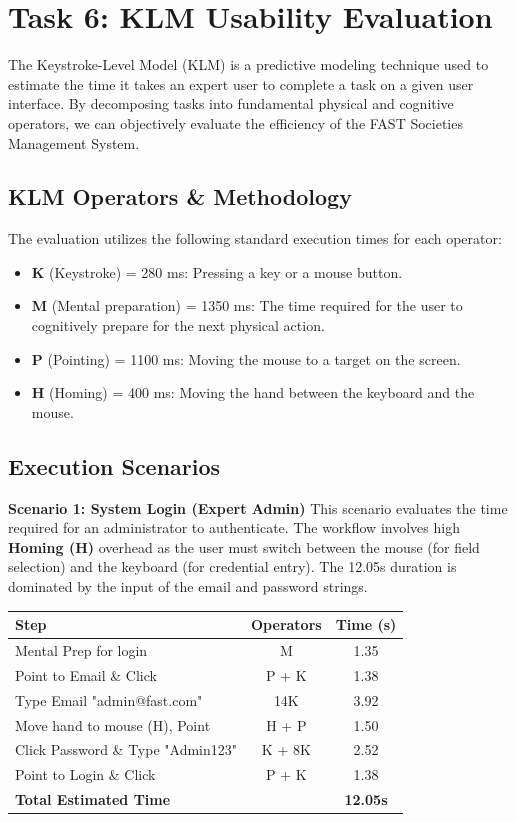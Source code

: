 \documentclass[12pt,a4paper]{article}
\begin{document}
\newpage
\section{Task 6: KLM Usability Evaluation}
The Keystroke-Level Model (KLM) is a predictive modeling technique used to estimate the time it takes an expert user to complete a task on a given user interface. By decomposing tasks into fundamental physical and cognitive operators, we can objectively evaluate the efficiency of the FAST Societies Management System.

\subsection{KLM Operators \& Methodology}
The evaluation utilizes the following standard execution times for each operator:
\begin{itemize}
    \item \textbf{K} (Keystroke) = 280 ms: Pressing a key or a mouse button.
    \item \textbf{M} (Mental preparation) = 1350 ms: The time required for the user to cognitively prepare for the next physical action.
    \item \textbf{P} (Pointing) = 1100 ms: Moving the mouse to a target on the screen.
    \item \textbf{H} (Homing) = 400 ms: Moving the hand between the keyboard and the mouse.
\end{itemize}

\subsection{Execution Scenarios}

\textbf{Scenario 1: System Login (Expert Admin)}
This scenario evaluates the time required for an administrator to authenticate. The workflow involves high \textbf{Homing (H)} overhead as the user must switch between the mouse (for field selection) and the keyboard (for credential entry). The 12.05s duration is dominated by the input of the email and password strings.
\begin{table}[H]
\centering
\begin{tabular}{lcc}
\toprule
\textbf{Step} & \textbf{Operators} & \textbf{Time (s)} \\
\midrule
Mental Prep for login & M & 1.35 \\
Point to Email \& Click & P + K & 1.38 \\
Type Email "admin@fast.com" & 14K & 3.92 \\
Move hand to mouse (H), Point & H + P & 1.50 \\
Click Password \& Type "Admin123" & K + 8K & 2.52 \\
Point to Login \& Click & P + K & 1.38 \\
\midrule
\textbf{Total Estimated Time} & & \textbf{12.05s} \\
\bottomrule
\end{tabular}
\end{table}
\end{document}
